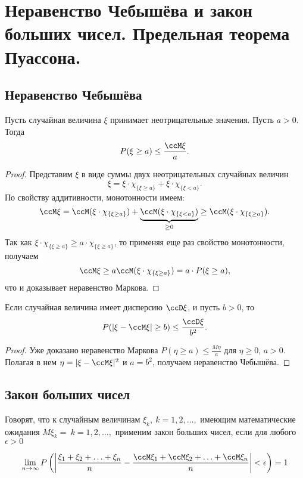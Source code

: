 \chapter{Неравенство Чебышёва и закон больших чисел. Предельная теорема Пуассона.}
\section{Неравенство Чебышёва}
\begin{thm}
Пусть случайная величина $\xi$ принимает неотрицательные значения. Пусть $a>0$. Тогда 
$$
P(\xi \ge a)\le\frac{\ccM\xi}{a}.
$$
\end{thm}
\begin{proof}
Представим $\xi$ в виде суммы двух неотрицательных случайных величин
$$
\xi = \xi\cdot\chi_{\{\xi\ge a\}}+\xi\cdot\chi_{\{\xi< a\}}.
$$
По свойству аддитивности, монотонности имеем:
$$
\ccM\xi=\ccM(\xi\cdot\chi_{\{\xi\ge a\}})+\underbrace{\ccM(\xi\cdot\chi_{\{\xi< a\}})}_{\ge 0} \ge \ccM(\xi\cdot\chi_{\{\xi\ge a\}}).
$$
Так как $\xi\cdot\chi_{\{\xi\ge a\}}\ge a\cdot\chi_{\{\xi\ge a\}}$, то применяя еще раз свойство монотонности, получаем
$$
\ccM\xi\ge a\ccM(\xi\cdot\chi_{\{\xi\ge a\}})=a\cdot P(\xi\ge a),
$$
что и доказывает неравенство Маркова.
\end{proof}

\begin{thm}
Если случайная величина имеет дисперсию $\ccD\xi$, и пусть $b>0$, то
$$
P(|\xi-\ccM\xi|\ge b ) \le\frac{\ccD\xi}{b^2}.
$$
\end{thm} 
\begin{proof}
Уже доказано неравенство Маркова $P(\eta \ge a) \le \frac{M\eta}{a}$  для $\eta \ge 0$, $a>0$. Полагая в нем $\eta = |\xi-\ccM\xi|^2$ и $a=b^2$, получаем неравенство Чебышёва.
\end{proof}

\section{Закон больших чисел}

Говорят, что к случайным величинам $\xi_k, \: k = 1, 2, \ldots,$ имеющим математические ожидания $M\xi_k = \: k = 1, 2,\ldots,$ применим закон больших чисел, если для любого $\epsilon > 0$

\begin{equation} \label{ch32.2eq4}
\lim_{n \to \infty} P \left( \left| \frac{\xi_1 + \xi_2 + \ldots + \xi_n}{n} - \frac{\ccM\xi_1 + \ccM\xi_2 + \ldots + \ccM\xi_n}{n} \right| < \epsilon \right) = 1
\end{equation}

